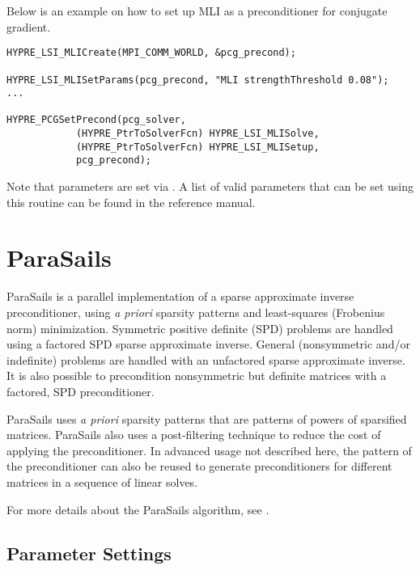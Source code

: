 Below is an example on how to set up MLI as a preconditioner
for conjugate gradient.

\begin{display}\begin{verbatim}
HYPRE_LSI_MLICreate(MPI_COMM_WORLD, &pcg_precond);

HYPRE_LSI_MLISetParams(pcg_precond, "MLI strengthThreshold 0.08");
...

HYPRE_PCGSetPrecond(pcg_solver,
		    (HYPRE_PtrToSolverFcn) HYPRE_LSI_MLISolve,
		    (HYPRE_PtrToSolverFcn) HYPRE_LSI_MLISetup,
		    pcg_precond);
\end{verbatim}\end{display}

\noindent
Note that parameters are set via . A list of
valid parameters that can be set using this routine can be found in the reference manual.


\section{ParaSails}

ParaSails is a parallel implementation of a sparse approximate inverse
preconditioner, using {\em a priori} sparsity patterns and least-squares
(Frobenius norm) minimization.  Symmetric positive definite (SPD) problems
are handled using a factored SPD sparse approximate inverse.  General
(nonsymmetric and/or indefinite) problems are handled with an
unfactored sparse approximate inverse.  It is also possible to
precondition nonsymmetric but definite matrices with a factored, SPD
preconditioner.

ParaSails uses {\em a priori} sparsity patterns that are patterns of powers
of sparsified matrices.  ParaSails also uses a post-filtering technique
to reduce the cost of applying the preconditioner.  
In advanced usage not described here, the pattern of the
preconditioner can also be reused to generate preconditioners for different
matrices in a sequence of linear solves.

For more details about the ParaSails algorithm, see \cite{EChow_2000}.


\subsection{Parameter Settings}

